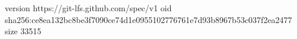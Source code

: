 version https://git-lfs.github.com/spec/v1
oid sha256:ce8ea132bc8be3f7090ce74d1e0955102776761e7d93b8967b53c037f2ea2477
size 33515
